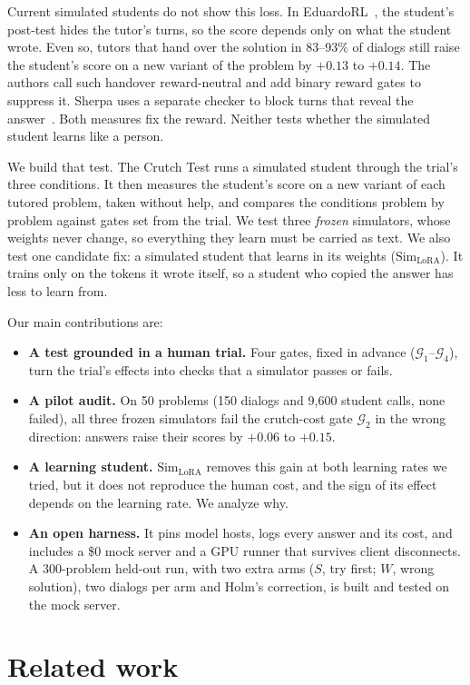 \documentclass{article} %
\newcommand{\simL}{\ensuremath{\text{Sim}_{\text{LoRA}}}}
\newcommand{\gate}[1]{\ensuremath{\mathcal{G}_{#1}}}
\begin{document}
Current simulated students do not show this loss. In EduardoRL~\citep{macina2026assistance}, the student's post-test hides the tutor's turns, so the score depends only on what the student wrote. Even so, tutors that hand over the solution in 83--93\% of dialogs still raise the student's score on a new variant of the problem by $+0.13$ to $+0.14$. The authors call such handover reward-neutral and add binary reward gates to suppress it. Sherpa uses a separate checker to block turns that reveal the answer~\citep{xu2026sherpa}. Both measures fix the reward. Neither tests whether the simulated student learns like a person.

We build that test. The Crutch Test runs a simulated student through the trial's three conditions. It then measures the student's score on a new variant of each tutored problem, taken without help, and compares the conditions problem by problem against gates set from the trial. We test three \emph{frozen} simulators, whose weights never change, so everything they learn must be carried as text. We also test one candidate fix: a simulated student that learns in its weights (\simL). It trains only on the tokens it wrote itself, so a student who copied the answer has less to learn from.

Our main contributions are:
\begin{itemize}
\item \textbf{A test grounded in a human trial.} Four gates, fixed in advance (\gate{1}--\gate{4}), turn the trial's effects into checks that a simulator passes or fails.
\item \textbf{A pilot audit.} On 50 problems (150 dialogs and 9{,}600 student calls, none failed), all three frozen simulators fail the crutch-cost gate \gate{2} in the wrong direction: answers raise their scores by $+0.06$ to $+0.15$.
\item \textbf{A learning student.} \simL{} removes this gain at both learning rates we tried, but it does not reproduce the human cost, and the sign of its effect depends on the learning rate. We analyze why.
\item \textbf{An open harness.} It pins model hosts, logs every answer and its cost, and includes a \$0 mock server and a GPU runner that survives client disconnects. A 300-problem held-out run, with two extra arms ($S$, try first; $W$, wrong solution), two dialogs per arm and Holm's correction, is built and tested on the mock server.
\end{itemize}

\section{Related work}
\label{sec:related-work}
\end{document}
